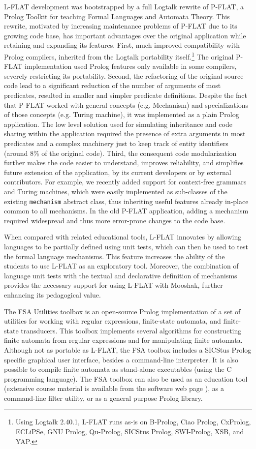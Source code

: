 \documentclass{llncs}
\begin{document}
L-FLAT development was bootstrapped by a full Logtalk rewrite of P-FLAT, a Prolog Toolkit for teaching Formal Languages and Automata Theory. This rewrite, motivated by increasing maintenance problems of P-FLAT due to its growing code base, has important advantages over the original application while retaining and expanding its features. First, much improved compatibility with Prolog compilers, inherited from the Logtalk portability itself.\footnote{Using Logtalk 2.40.1, L-FLAT runs as-is on B-Prolog, Ciao Prolog, CxProlog, ECLiPSe, GNU Prolog, Qu-Prolog, SICStus Prolog, SWI-Prolog, XSB, and YAP.} The original P-FLAT implementation used Prolog features only available in some compilers, severely restricting its portability. Second, the refactoring of the original source code lead to a significant reduction of the number of arguments of most predicates, resulted in smaller and simpler predicate definitions. Despite the fact that P-FLAT worked with general concepts (e.g. Mechanism) and specializations of those concepts (e.g. Turing machine), it was implemented as a plain Prolog application. The low level solution used for simulating inheritance and code sharing within the application required the presence of extra arguments in most predicates and a complex machinery just to keep track of entity identifiers (around 8\% of the original code). Third, the consequent code modularization further makes the code easier to understand, improves reliability, and simplifies future extension of the application, by its current developers or by external contributors. For example, we recently added support for context-free grammars and Turing machines, which were easily implemented as sub-classes of the existing \lstinline{mechanism} abstract class, thus inheriting useful features already in-place common to all mechanisms. In the old P-FLAT application, adding a mechanism required widespread and thus more error-prone changes to the code base.

When compared with related educational tools, L-FLAT innovates by allowing languages to be partially defined using unit tests, which can then be used to test the formal language mechanisms. This feature increases the ability of the students to use L-FLAT as an exploratory tool. Moreover, the combination of language unit tests with the textual and declarative definition of mechanisms provides the necessary support for using L-FLAT with Mooshak, further enhancing its pedagogical value.

The FSA Utilities toolbox \cite{fsa} is an open-source Prolog implementation of a set of utilities for working with regular expressions, finite-state automata, and finite-state transducers. This toolbox implements several algorithms for constructing finite automata from regular expressions and for manipulating finite automata. Although not as portable as L-FLAT, the FSA toolbox includes a SICStus Prolog specific graphical user interface, besides a command-line interpreter. It is also possible to compile finite automata as stand-alone executables (using the C programming language). The FSA toolbox can also be used as an education tool (extensive course material is available from the software web page \cite{fsaweb}), as a command-line filter utility, or as a general purpose Prolog library.
\end{document}
